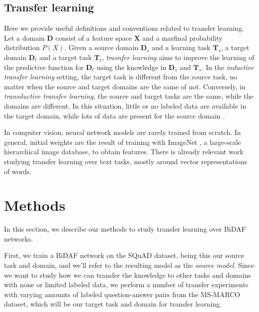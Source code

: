 \documentclass[11pt,a4paper]{article}
\begin{document}
%

\subsection{Transfer learning}
\label{ssec:transfer_learning}
Here we provide useful definitions and conventions related to transfer learning. Let a domain  $\textbf{D}$ consist of a feature space $\textbf{X}$ and a marfinal probability distribution $P(X)$. Given a source domain $\textbf{D}_s$ and a learning task $\textbf{T}_s$, a target domain $\textbf{D}_t$ and a target task $\textbf{T}_t$, \textit{trasnfer learning} aims to improve the learning of the predictive function for $\textbf{D}_t$ using the knowledge in $\textbf{D}_s$ and $\textbf{T}_s$. In the \textit{inductive transfer learning} setting, the target task is different from the source task, no matter when the source and target domains are the same of not. Conversely, in \textit{transductive transfer learning}, the source and target tasks are the same, while the domains are different. In this situation, little or no labeled data are available in the target domain, while lots of data are present for the source domain \cite{surveytransferlearning} \cite{conneau:2017} \cite{deepcontextualizedwr} \cite{conneau:2017}. 

In computer vision, neural network models are rarely trained from scratch. In general, initial weights are the result of training with ImageNet \cite{imagenet}, a large-scale hierarchical image database, to obtain features. There is already relevant work studying transfer learning over text tasks, mostly around vector representations of words. 

\section{Methods}
\label{sec:methods}

In this section, we describe our methods to study transfer learning over BiDAF networks. 

First, we train a BiDAF network on the SQuAD dataset, being this our source task and domain, and we'll refer to the resulting model as the \textit{source model}. Since we want to study how we can transfer the knowledge to other tasks and domains with none or limited labeled data, we perform a number of transfer experiments with varying amounts of labeled question-answer pairs from the MS-MARCO dataset, which will be our target task and domain for transfer learning.
\end{document}
